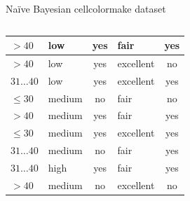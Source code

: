 \documentclass[aspectratio=169,t,table]{beamer}
\begin{document}
{\begin{frame}{Naïve Bayesian cellcolormake dataset}
\begin{columns}
\begin{column}{0.6\textwidth}
{\begin{tabular}{|l|l|c|l|c|}
            \cellcolor{yellow!20}$>40$ & \cellcolor{yellow!20}low & \cellcolor{yellow!20}yes & \cellcolor{yellow!20}fair & \cellcolor{green!20}yes \\\hline
            \cellcolor{yellow!20}$>40$ & \cellcolor{yellow!20}low & \cellcolor{yellow!20}yes & \cellcolor{yellow!20}excellent & \cellcolor{red!20}no \\\hline
            \cellcolor{yellow!20}$31\ldots40$ & \cellcolor{yellow!20}low & \cellcolor{yellow!20}yes & \cellcolor{yellow!20}excellent & \cellcolor{green!20}yes \\\hline
            \cellcolor{yellow!20}$\leq30$ & \cellcolor{yellow!20}medium & \cellcolor{yellow!20}no & \cellcolor{yellow!20}fair & \cellcolor{red!20}no \\\hline
            \cellcolor{yellow!20}$>40$ & \cellcolor{yellow!20}medium & \cellcolor{yellow!20}yes & \cellcolor{yellow!20}fair & \cellcolor{green!20}yes \\\hline
            \cellcolor{yellow!20}$\leq30$ & \cellcolor{yellow!20}medium & \cellcolor{yellow!20}yes & \cellcolor{yellow!20}excellent & \cellcolor{green!20}yes \\\hline
            \cellcolor{yellow!20}$31\ldots40$ & \cellcolor{yellow!20}medium & \cellcolor{yellow!20}no & \cellcolor{yellow!20}fair & \cellcolor{green!20}yes \\\hline
            \cellcolor{yellow!20}$31\ldots40$ & \cellcolor{yellow!20}high & \cellcolor{yellow!20}yes & \cellcolor{yellow!20}fair & \cellcolor{green!20}yes \\\hline
            \cellcolor{yellow!20}$>40$ & \cellcolor{yellow!20}medium & \cellcolor{yellow!20}no & \cellcolor{yellow!20}excellent & \cellcolor{red!20}no \\\hline
          \end{tabular}}
        \end{column}
      \end{columns}
    \end{frame}
  }
\end{document}

